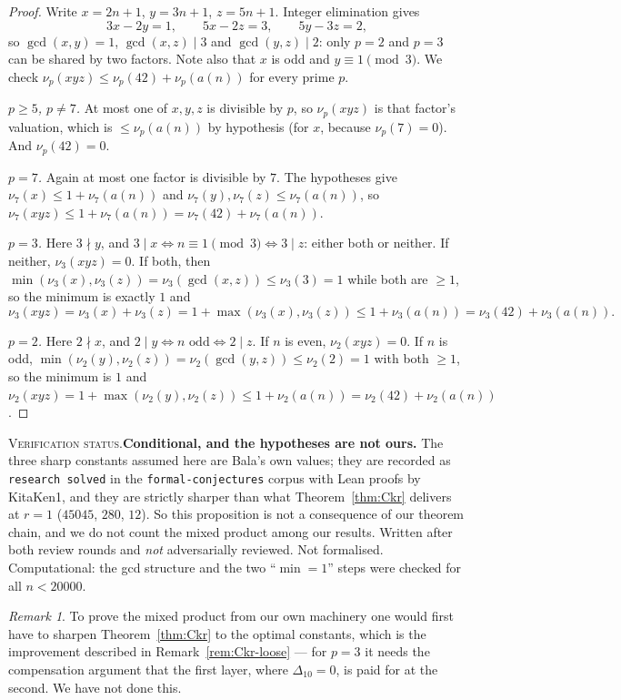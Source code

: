 \documentclass[11pt]{article}
\theoremstyle{plain}
\theoremstyle{definition}
\theoremstyle{remark}
\newtheorem*{remark}{Remark}
\numberwithin{equation}{section}
\newcommand{\vstatus}[1]{%
  \par\vspace{3pt}\noindent
  {\small\textsc{Verification status.}\enspace #1}\par\vspace{3pt}}
\begin{document}
\begin{proof}
Write $x = 2n+1$, $y = 3n+1$, $z = 5n+1$. Integer elimination gives
\[
  3x - 2y = 1, \qquad 5x - 2z = 3, \qquad 5y - 3z = 2,
\]
so $\gcd(x,y) = 1$, $\gcd(x,z) \mid 3$ and $\gcd(y,z)\mid 2$: only $p = 2$ and $p=3$ can be
shared by two factors. Note also that $x$ is odd and $y \equiv 1 \pmod 3$. We check
$\nu_p(xyz) \le \nu_p(42) + \nu_p(a(n))$ for every prime $p$.

\emph{$p \ge 5$, $p \ne 7$.} At most one of $x,y,z$ is divisible by $p$, so $\nu_p(xyz)$ is that
factor's valuation, which is $\le \nu_p(a(n))$ by hypothesis (for $x$, because $\nu_p(7)=0$). And
$\nu_p(42) = 0$.

\emph{$p = 7$.} Again at most one factor is divisible by $7$. The hypotheses give
$\nu_7(x) \le 1 + \nu_7(a(n))$ and $\nu_7(y), \nu_7(z) \le \nu_7(a(n))$, so
$\nu_7(xyz) \le 1 + \nu_7(a(n)) = \nu_7(42) + \nu_7(a(n))$.

\emph{$p = 3$.} Here $3 \nmid y$, and $3 \mid x \iff n \equiv 1 \pmod 3 \iff 3 \mid z$: either
both or neither. If neither, $\nu_3(xyz) = 0$. If both, then
$\min(\nu_3(x),\nu_3(z)) = \nu_3(\gcd(x,z)) \le \nu_3(3) = 1$ while both are $\ge 1$, so the
minimum is exactly $1$ and
\[
  \nu_3(xyz) = \nu_3(x)+\nu_3(z) = 1 + \max(\nu_3(x),\nu_3(z)) \le 1 + \nu_3(a(n))
  = \nu_3(42)+\nu_3(a(n)).
\]

\emph{$p = 2$.} Here $2 \nmid x$, and $2 \mid y \iff n \text{ odd} \iff 2 \mid z$. If $n$ is even,
$\nu_2(xyz) = 0$. If $n$ is odd, $\min(\nu_2(y),\nu_2(z)) = \nu_2(\gcd(y,z)) \le \nu_2(2) = 1$
with both $\ge 1$, so the minimum is $1$ and
$\nu_2(xyz) = 1 + \max(\nu_2(y),\nu_2(z)) \le 1 + \nu_2(a(n)) = \nu_2(42)+\nu_2(a(n))$.
\end{proof}
\vstatus{\textbf{Conditional, and the hypotheses are not ours.} The three sharp constants assumed
here are Bala's own values; they are recorded as \texttt{research solved} in the
\texttt{formal-conjectures} corpus with Lean proofs by KitaKen1, and they are strictly sharper
than what Theorem~\ref{thm:Ckr} delivers at $r=1$ ($45045$, $280$, $12$). So this proposition is
not a consequence of our theorem chain, and we do not count the mixed product among our results.
Written after both review rounds and \emph{not} adversarially reviewed. Not formalised.
Computational: the gcd structure and the two ``$\min = 1$'' steps were checked for all
$n < 20000$.}

\begin{remark}
To prove the mixed product from our own machinery one would first have to sharpen
Theorem~\ref{thm:Ckr} to the optimal constants, which is the improvement described in
Remark~\ref{rem:Ckr-loose} --- for $p=3$ it needs the compensation argument that the first layer,
where $\Delta_{10}=0$, is paid for at the second. We have not done this.
\end{remark}
\end{document}
